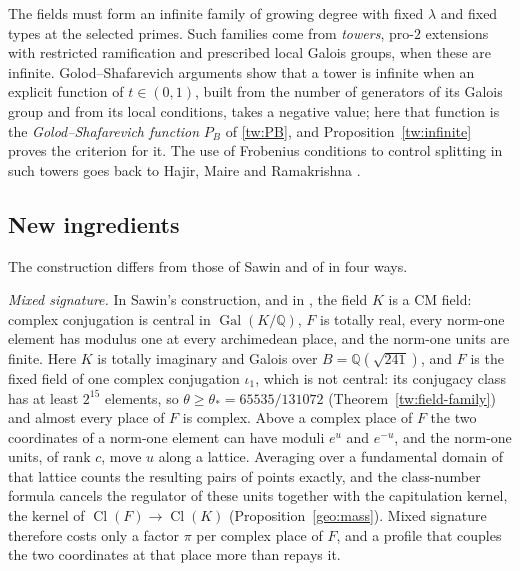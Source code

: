 \documentclass[11pt]{amsart}
\numberwithin{equation}{section}
\theoremstyle{definition}
\theoremstyle{remark}
\DeclareMathOperator{\Gal}{Gal}
\DeclareMathOperator{\Cl}{Cl}
\newcommand{\Q}{\mathbb Q}
\newcommand{\thetastar}{65535/131072}
\begin{document}
The fields must form an infinite family of growing degree with fixed
$\lambda$ and fixed types at the selected primes. Such families come
from \emph{towers}, pro-$2$ extensions with restricted ramification and
prescribed local Galois groups, when these are infinite.
Golod--Shafarevich arguments \cite{GolodShafarevich} show that a tower
is infinite when an explicit function of $t\in(0,1)$, built from the
number of generators of its Galois group and from its local conditions,
takes a negative value; here that function is the
\emph{Golod--Shafarevich function} $P_B$ of \eqref{tw:PB}, and
Proposition~\ref{tw:infinite} proves the criterion for it. The use of
Frobenius conditions to control splitting in such towers goes back to Hajir, Maire and Ramakrishna
\cite{HajirMaireRamakrishna2021Cutting}.

\subsection{New ingredients}\label{intro:new}
The construction differs from those of Sawin \cite{Sawin2026} and of
\cite{Naslund0358} in four ways.

\emph{Mixed signature.} In Sawin's construction, and in
\cite{Naslund0358}, the field $K$ is a CM field: complex conjugation is
central in $\Gal(K/\Q)$, $F$ is totally real, every norm-one element has
modulus one at every archimedean place, and the norm-one units are
finite. Here $K$ is totally imaginary and Galois over $B=\Q(\sqrt{241})$,
and $F$ is the fixed field of one complex conjugation $\iota_1$, which is
not central: its conjugacy class has at least $2^{15}$ elements, so
$\theta\ge\theta_*=\thetastar$ (Theorem~\ref{tw:field-family}) and
almost every place of $F$ is complex. Above a
complex place of $F$ the two coordinates of a norm-one element can have
moduli $e^u$ and $e^{-u}$, and the norm-one units, of rank $c$, move $u$
along a lattice. Averaging over a fundamental domain of that lattice
counts the resulting pairs of points exactly, and the class-number
formula cancels the regulator of these units together with the
capitulation kernel, the kernel of $\Cl(F)\to\Cl(K)$
(Proposition~\ref{geo:mass}). Mixed signature therefore costs only
a factor $\pi$ per complex place of $F$, and a profile that couples the
two coordinates at that place more than repays it.
\end{document}
